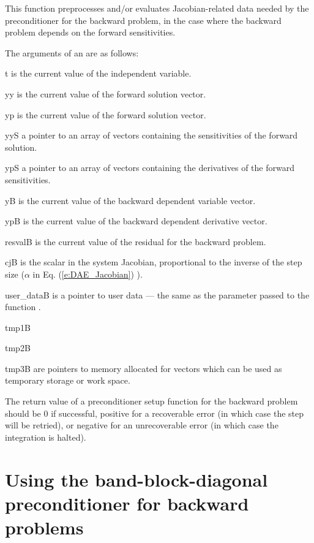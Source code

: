 {
  This function preprocesses and/or evaluates Jacobian-related data needed
  by the preconditioner for the backward problem, in the case where the
  backward problem depends on the forward sensitivities.
}
{
  The arguments of an  are as follows:
  \begin{args}
  \item[t]
    is the current value of the independent variable.
  \item[yy]
    is the current value of the forward solution vector.
  \item[yp]
    is the current value of the forward solution vector.
  \item[yyS]
    a pointer to an array of  vectors containing the sensitivities of 
    the forward solution.
  \item[ypS]
    a pointer to an array of  vectors containing the derivatives of 
    the forward sensitivities.
  \item[yB]
    is the current value of the backward dependent variable vector.
  \item[ypB]
    is the current value of the backward dependent derivative vector.
  \item[resvalB]
    is the current value of the residual for the backward problem.
  \item[cjB]
    is the scalar in the system Jacobian, proportional to the inverse of the
    step size ($\alpha$ in Eq. (\ref{e:DAE_Jacobian}) ).
  \item[user\_dataB]
    is a pointer to user data --- the same as the 
    parameter passed to the function .
  \item[tmp1B]
  \item[tmp2B]
  \item[tmp3B]
    are pointers to memory allocated for vectors which can be used           
    as temporary storage or work space.    
  \end{args}
}
{
  The return value of a preconditioner setup function for the backward
  problem should be $0$ if successful, 
  positive for a recoverable error (in which case the step will be retried),     
  or negative for an unrecoverable error (in which case the integration is halted).
}
{}

\section{Using the band-block-diagonal preconditioner for backward problems}

